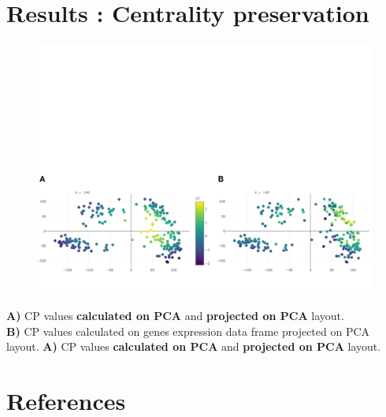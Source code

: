 \documentclass[compress]{beamer}
\begin{document}

\section{Results : Centrality preservation}
\begin{frame}
\vspace*{-1cm}
\begin{figure}
    \centering
    \includegraphics[width = \linewidth]{figures/results/results_map.pdf}
\end{figure}

\textbf{A)} CP values \textbf{calculated on PCA}  and  \textbf{projected on PCA} layout. \\
\textbf{B)} CP values calculated  on genes expression data frame projected on PCA layout. 
\textbf{A)} CP values \textbf{calculated on PCA}  and  \textbf{projected on PCA} layout. \\

  \begin{flushright}
\color{IARCdblue}{ \scriptsize{\insertframenumber / \inserttotalframenumber}} \hspace*{2mm}
  \end{flushright}

\end{frame}





\section{References}
\subsection{}
\begin{frame}[shrink=40, noframenumbering]
\tiny %
\end{frame}
\end{document}
